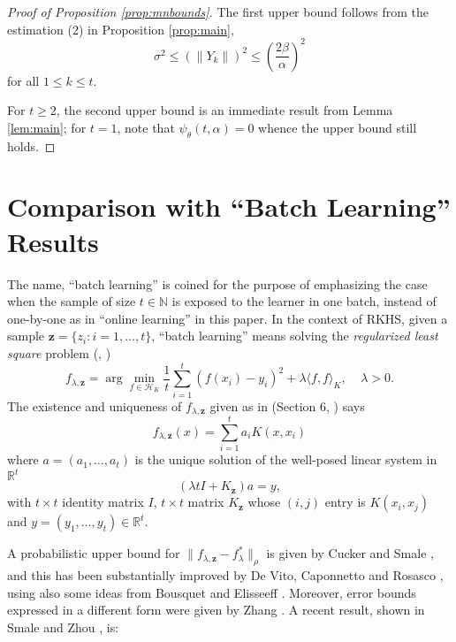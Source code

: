 \documentclass[twoside]{amsart}
\theoremstyle{theorem}
\theoremstyle{definition}
\theoremstyle{remark}
\def\H{{\mathscr H}}
\def\N{{\mathbb N}}
\def\z{{\mathbf z}}
\def\R{{\mathbb R}}        %
\def\<{{\langle}}
\def\>{{\rangle}}
\begin{document}
\begin{proof}[Proof of Proposition \ref{prop:mnbounds}]
The first upper bound follows from the estimation (2) in Proposition \ref{prop:main},
\[ \sigma^2 \leq (\| Y_k \| )^2 \leq \left(\frac{2\beta}{\alpha}\right)^2 \]
for all $1\leq k \leq t$.

For $t\geq 2$, the second upper bound is an immediate result from Lemma \ref{lem:main}; for $t=1$, note that $\psi_\theta(t,\alpha)=0$ whence
the upper bound still holds.
\end{proof}




\section{Comparison with ``Batch Learning'' Results}


The name, ``batch learning'' is coined for the purpose of
emphasizing the case when the sample of size $t\in \N$ is exposed
to the learner in one batch, instead of one-by-one as in ``online
learning'' in this paper. In the context of RKHS, given a sample
$\z=\{z_i:i=1,\ldots,t\}$, ``batch learning'' means solving the
\emph{regularized least square} problem (\cite{EvgPonPog99},
\cite{CucSma02})
\[ f_{\lambda,\z} = \arg\min_{f\in \H_K} \frac{1}{t}\sum_{i=1}^t (f(x_i)-y_i)^2 + \lambda \< f, f \>_K, \ \ \ \ \ \lambda>0. \]
The existence and uniqueness of $f_{\lambda,\z}$ given as in (Section 6, \cite{CucSma02}) says
\[ f_{\lambda,\z}(x)= \sum_{i=1}^t a_i K(x,x_i) \]
where $a=(a_1,\ldots,a_t)$ is the unique solution of the well-posed linear system in $\R^t$
\[ (\lambda t I + K_\z) a = y, \]
with $t\times t$ identity matrix $I$, $t\times t$ matrix $K_\z$ whose $(i,j)$ entry is $K(x_i,x_j)$ and $ y=(y_1,\ldots,y_t)\in \R^t$.

A probabilistic upper bound for
$\|f_{\lambda,\z}-f^\ast_\lambda\|_\rho$ is given by
Cucker and Smale \cite{CucSma02b}, and this has been substantially improved by
De Vito, Caponnetto and Rosasco \cite{DevCapRos04}, using also some ideas from Bousquet and Elisseeff \cite{BouEli02}.
Moreover, error bounds expressed in a different form were given by
Zhang \cite{Zhang03}. A recent result, shown in Smale and Zhou \cite{SmaZho-ShannonII}, is:
\end{document}
